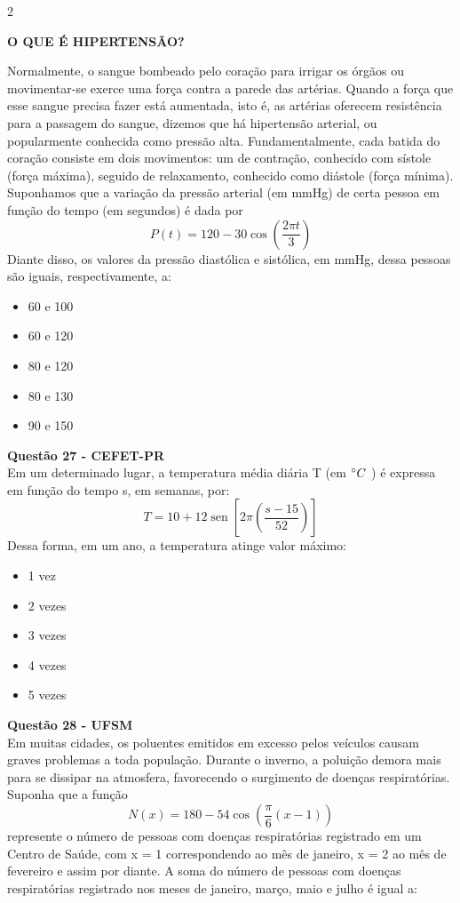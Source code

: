 \documentclass[12pt]{article}
\newcommand{\sen}{\operatorname{sen}}
\newcommand{\vermelho}[1]{{\color{red}#1}}
\begin{document}
\begin{multicols}{2}
	\begin{center}
		\textbf{O QUE É HIPERTENSÃO?}
	\end{center} Normalmente, o sangue bombeado pelo coração para
	irrigar os órgãos ou movimentar-se exerce uma força contra a
	parede das artérias. Quando a força que esse sangue precisa
	fazer está aumentada, isto é, as artérias oferecem resistência
	para a passagem do sangue, dizemos que há hipertensão
	arterial, ou popularmente conhecida como pressão alta.
	Fundamentalmente, cada batida do coração consiste em dois
	movimentos: um de contração, conhecido com sístole (força
	máxima), seguido de relaxamento, conhecido como diástole
	(força mínima). \\
	
	Suponhamos que a variação da pressão arterial (em mmHg)
	de certa pessoa em função do tempo (em segundos) é dada
	por $$P(t)=120-30\cos\left( \dfrac{2\pi t}{3} \right) $$ Diante disso, os valores da pressão diastólica e sistólica, em mmHg, dessa pessoas são iguais, respectivamente, a:
	
	\begin{itemize}
		\item[(A)] 60 e 100
		\item[(B)] 60 e 120
		\item[(C)] 80 e 120
		\item[(D)] 80 e 130
		\item[(E)] \vermelho{90 e 150} %
	\end{itemize}

\textbf{Questão 27 - CEFET-PR} \\

	Em um determinado lugar, a temperatura média diária T (em $\degree C$ ) é expressa em função do tempo s, em semanas, por: $$T=10+12\sen\left[2\pi \left( \dfrac{s-15}{52} \right)  \right]$$ Dessa forma, em um ano, a temperatura atinge valor máximo:
	
	\begin{itemize}
		\item[(A)] \vermelho{1 vez} %
		\item[(B)] 2 vezes
		\item[(C)] 3 vezes
		\item[(D)] 4 vezes
		\item[(E)] 5 vezes
	\end{itemize}
	
	
\textbf{Questão 28 - UFSM} \\

	Em muitas cidades, os poluentes emitidos em excesso pelos veículos causam graves problemas a toda população. Durante o inverno, a poluição demora mais para se dissipar na atmosfera, favorecendo o surgimento de doenças respiratórias. Suponha que a função $$ N(x)=180-54\cos \left( \dfrac{\pi}{6} \left( x-1 \right)  \right) $$ represente o número de pessoas com doenças respiratórias registrado em um Centro de Saúde, com x = 1 correspondendo
	ao mês de janeiro, x = 2 ao mês de fevereiro e assim por diante. A soma do número de pessoas com doenças respiratórias registrado nos meses de janeiro, março, maio e julho é igual a:
	

\end{multicols}
\end{document}
